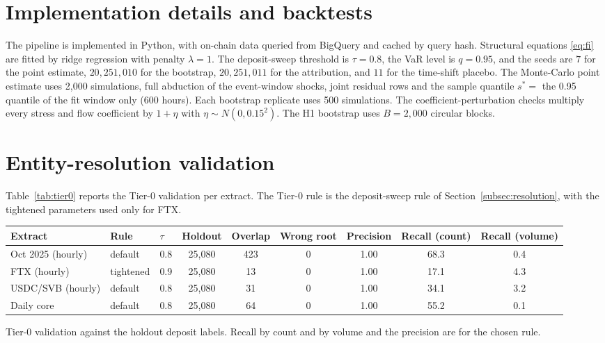 \documentclass[referee,pdflatex,sn-mathphys-ay]{sn-jnl}
\newcommand{\fitbox}{\ifdim\wd\tabbox>\linewidth\resizebox{\linewidth}{!}{\usebox{\tabbox}}\else\usebox{\tabbox}\fi}%
\theoremstyle{thmstyleone}%
\theoremstyle{thmstyletwo}%
\theoremstyle{thmstylethree}%
\begin{document}
\begin{appendices}

\section{Implementation details and backtests}\label{app:impl}

The pipeline is implemented in Python, with on-chain data queried from BigQuery and cached by query hash. Structural equations
\eqref{eq:fi} are fitted by ridge regression with penalty $\lambda=1$. The deposit-sweep threshold is $\tau=0.8$, the VaR
level is $q=0.95$, and the seeds are $7$ for the point estimate, $20{,}251{,}010$ for the bootstrap, $20{,}251{,}011$ for the
attribution, and $11$ for the time-shift placebo. The Monte-Carlo point estimate uses 2{,}000 simulations, full abduction of
the event-window shocks, joint residual rows and the sample quantile $s^\ast=$ the 0.95 quantile of the fit window only
(600 hours). Each bootstrap replicate uses 500 simulations. The coefficient-perturbation checks multiply
every stress and flow coefficient by $1+\eta$ with $\eta\sim N(0,0.15^2)$. The H1 bootstrap uses $B=2{,}000$ circular blocks.

\section{Entity-resolution validation}\label{app:resolution}

Table~\ref{tab:tier0} reports the Tier-0 validation per extract. The Tier-0 rule is the deposit-sweep rule of
Section~\ref{subsec:resolution}, with the tightened parameters used only for FTX.

\begin{lrbox}{\tabbox}\footnotesize\setlength{\tabcolsep}{3pt}%
\begin{tabular}{@{}lllcccccc@{}}
\toprule
\textbf{Extract} & \textbf{Rule} & \textbf{$\tau$} & \textbf{Holdout} & \textbf{Overlap} & \textbf{Wrong root} & \textbf{Precision} & \textbf{Recall (count)} & \textbf{Recall (volume)}\\
\midrule
Oct 2025 (hourly) & default & 0.8 & 25{,}080 & 423 & 0 & 1.00 & 68.3 & 0.4 \\
FTX (hourly) & tightened & 0.9 & 25{,}080 & 13 & 0 & 1.00 & 17.1 & 4.3 \\
USDC/SVB (hourly) & default & 0.8 & 25{,}080 & 31 & 0 & 1.00 & 34.1 & 3.2 \\
Daily core & default & 0.8 & 25{,}080 & 64 & 0 & 1.00 & 55.2 & 0.1 \\
\bottomrule
\end{tabular}
\end{lrbox}
\begin{tableorg}[tbp]
\centering
\caption{Tier-0 validation against the holdout deposit labels. Recall by count and by volume and the precision are for the chosen rule.}
\label{tab:tier0}
\fitbox
\end{tableorg}


\end{appendices}
\end{document}
